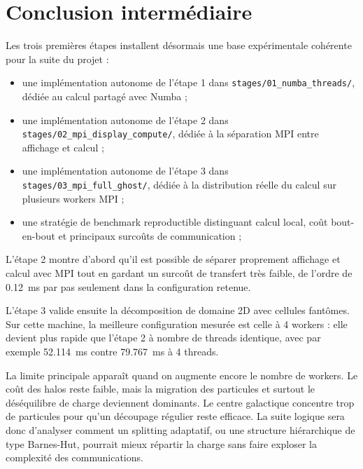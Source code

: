\section{Conclusion intermédiaire}

Les trois premières étapes installent désormais une base expérimentale cohérente pour la suite du projet :
\begin{itemize}
    \item une implémentation autonome de l'étape 1 dans \texttt{stages/01\_numba\_threads/}, dédiée au calcul partagé avec Numba ;
    \item une implémentation autonome de l'étape 2 dans \texttt{stages/02\_mpi\_display\_compute/}, dédiée à la séparation MPI entre affichage et calcul ;
    \item une implémentation autonome de l'étape 3 dans \texttt{stages/03\_mpi\_full\_ghost/}, dédiée à la distribution réelle du calcul sur plusieurs workers MPI ;
    \item une stratégie de benchmark reproductible distinguant calcul local, coût bout-en-bout et principaux surcoûts de communication ;
\end{itemize}

L'étape 2 montre d'abord qu'il est possible de séparer proprement affichage et calcul avec MPI tout en gardant un surcoût de transfert très faible, de l'ordre de \SI{0.12}{ms} par pas seulement dans la configuration retenue.

L'étape 3 valide ensuite la décomposition de domaine 2D avec cellules fantômes. Sur cette machine, la meilleure configuration mesurée est celle à 4 workers : elle devient plus rapide que l'étape 2 à nombre de threads identique, avec par exemple \SI{52.114}{ms} contre \SI{79.767}{ms} à 4 threads.

La limite principale apparaît quand on augmente encore le nombre de workers. Le coût des halos reste faible, mais la migration des particules et surtout le déséquilibre de charge deviennent dominants. Le centre galactique concentre trop de particules pour qu'un découpage régulier reste efficace. La suite logique sera donc d'analyser comment un splitting adaptatif, ou une structure hiérarchique de type Barnes-Hut, pourrait mieux répartir la charge sans faire exploser la complexité des communications.
